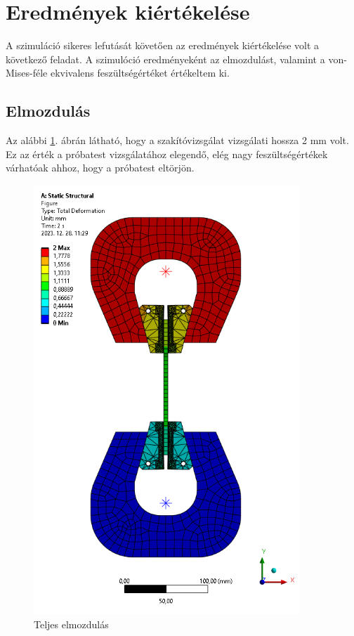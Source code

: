 \documentclass[12pt,a4paper,oneside]{report}
\begin{document}
\section{Eredmények kiértékelése}
A szimuláció sikeres lefutását követően az eredmények kiértékelése volt a következő feladat. A szimulóció eredményeként az elmozdulást, valamint a von-Mises-féle ekvivalens feszültségértéket értékeltem ki.

\subsection{Elmozdulás}
Az alábbi \ref{Fig:mesh_5}. ábrán látható, hogy a szakítóvizsgálat vizsgálati hossza 2 mm volt. Ez az érték a próbatest vizsgálatához elegendő, elég nagy feszültségértékek várhatóak ahhoz, hogy a próbatest eltörjön.

\begin{figure}[H]
    \centering
    \includegraphics[width=10cm]{figures/mesh_5.png}
    \caption{Teljes elmozdulás}
    \label{Fig:mesh_5}
\end{figure}
\end{document}
